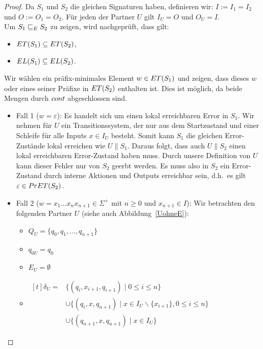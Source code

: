 \begin{proof}
  Da $S_1$ und $S_2$ die gleichen Signaturen haben, definieren wir:
  $I:=I_1=I_2$ und $O:=O_1=O_2$. Für jeden der Partner $U$ gilt $I_U=O$ und
  $O_U=I$.\\
  Um $S_1\ERel S_2$ zu zeigen, wird nachgeprüft, dass gilt:
  \begin{itemize}
    \item $\ET{}(S_1)\subseteq \ET{}(S_2)$,
    \item $\EL{}(S_1)\subseteq \EL{}(S_2)$.
  \end{itemize}
  Wir wählen ein präfix-minimales Element $w\in \ET{}(S_1)$ und
  zeigen, dass dieses $w$ oder eines seiner Präfixe in $\ET{}(S_2)$ enthalten ist.
  Dies ist möglich, da beide Mengen durch $\cont{}$ abgeschlossen sind.
  \begin{itemize}
    \item Fall 1 ($w=\varepsilon$): Es handelt sich um einen lokal erreichbaren
      Error in $S_1$.
      Wir nehmen für $U$ ein Transitionssystem, der nur aus dem Startzustand und
      einer Schleife für alle Inputs $x\in I_U$ besteht. Somit kann $S_1$ die gleichen
      Error-Zustände lokal erreichen wie $U\|S_1$. Daraus folgt, dass auch
      $U\|S_2$ einen lokal erreichbaren Error-Zustand haben muss. Durch unsere
      Definition von $U$ kann dieser Fehler nur von $S_2$ geerbt werden. Es
      muss also in $S_2$ ein Error-Zustand durch interne Aktionen und Outputs
      erreichbar sein, d.h.\ es gilt $\varepsilon\in \PrET{}(S_2)$.
    \item Fall 2 ($w=x_1\dots x_n x_{n+1}\in\Sigma ^+$ mit $n\geq 0$ und
      $x_{n+1}\in I$): Wir betrachten den folgenden Partner $U$ (siehe auch
      Abbildung~\ref{UohneE}):
      \begin{itemize}
        \item $Q_U=\{q_0,q_1,\dots ,q_{n+1}\}$
        \item $q_{0U}=q_0$
        \item $E_U=\emptyset$
        \item $\begin{aligned}[t]
            \delta _U=&\{(q_i,x_{i+1},q_{i+1})\mid  0\leq i\leq n\}\\
                      &\cup\{(q_i,x,q_{n+1})\mid  x\in I_U\backslash\{x_{i+1}\},
          0\leq i\leq n\}\\
          &\cup\{(q_{n+1},x,q_{n+1})\mid  x\in I_U\}
        \end{aligned}$
      \end{itemize}
      \begin{figure} [h!tbp]
      \begin{center}
        \begin{tikzpicture}[->, >=latex',auto,node distance =3cm, semithick]


\end{tikzpicture}
\end{center}
\end{figure}
\end{itemize}
\end{proof}
